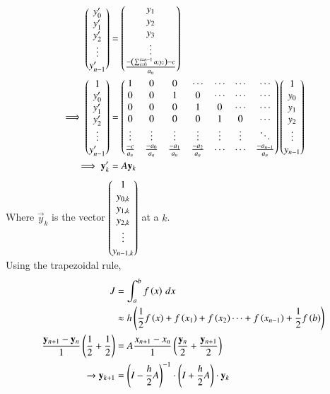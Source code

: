 \documentclass[journal]{IEEEtran}
\begin{document}
\begin{align}
    \begin{pmatrix}y_{0}^{\prime}\\y_{1}^{\prime}\\y_{2}^{\prime}\\ \vdots\\y^{\prime}_{n-1}\end{pmatrix}&=\begin{pmatrix}y_{1}\\y_{2}\\y_{3}\\ \vdots\\ \frac{-\left(\sum_{i=0}^{i=n-1}a_iy_i\right)-c}{a_n}\end{pmatrix}\\
    \implies  \begin{pmatrix}1\\y_{0}^{\prime}\\y_{1}^{\prime}\\y_{2}^{\prime}\\ \vdots\\y^{\prime}_{n-1}\end{pmatrix}&=\begin{pmatrix}1&0&0&\cdots&\cdots&\cdots&\cdots\\0&0&1&0&\cdots&\cdots&\cdots\\0&0&0&1&0&\cdots&\cdots\\0&0&0&0&1&0&\cdots\\ \vdots&\vdots&\vdots&\vdots&\vdots&\vdots&\ddots\\ \frac{-c}{a_n}&\frac{-a_{0}}{a_n}&\frac{-a_{1}}{a_n}&\frac{-a_{2}}{a_n}&\cdots&\cdots&\frac{-a_{n-1}}{a_n}\end{pmatrix}\begin{pmatrix}1\\y_{0}\\y_{1}\\y_{2}\\ \vdots\\y_{n-1}\end{pmatrix}\\
    \implies \mathbf{y}_k^{\prime}&=A\mathbf{y}_k
\end{align}
Where $\vec{y}_k$ is the vector $\begin{pmatrix}1\\y_{0,k}\\y_{1,k}\\y_{2,k}\\ \vdots\\y_{n-1,k}\end{pmatrix}$ at a $k$.\\
Using the trapezoidal rule,
\begin{align}
    J &= \int_a^b f\left(x\right)\, dx\\
    &\approx h\left(\frac{1}{2}f\left(x\right) + f\left(x_1\right) + f\left(x_2\right) \cdots + f\left(x_{n-1}\right) + \frac{1}{2}f\left(b\right)\right)\\
    \frac{\mathbf{y}_{n+1} - \mathbf{y}_n}{1}\left(\frac{1}{2} + \frac{1}{2}\right)
    &= A\frac{x_{n+1} - x_{n}}{1}\left(\frac{\mathbf{y}_n}{2} +\frac{\mathbf{y}_{n+1}}{2}\right) \\ 
    \xrightarrow{} \mathbf{y}_{k+1}&=\left(I-\frac{h}{2}A\right)^{-1}\cdot\left(I+\frac{h}{2}A\right)\cdot\mathbf{y}_k
\end{align}
\end{document}
